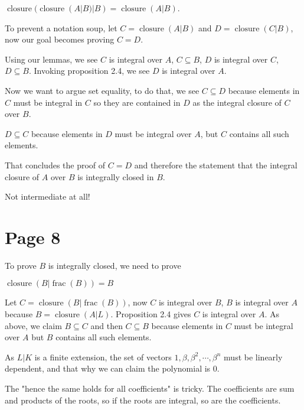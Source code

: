\documentclass{article}
\DeclareMathOperator{\fractionfield}{frac}
\DeclareMathOperator{\closure}{closure}
\begin{document}
$ \closure(\closure(A | B) | B) = \closure(A | B) $.

To prevent a notation soup, let $ C = \closure(A | B) $ and $ D = \closure(C | B) $, now our goal becomes proving $ C = D $.

Using our lemmas, we see $ C $ is integral over $ A $, $ C \subseteq B $, $ D $ is integral over $ C $, $ D \subseteq B $. Invoking proposition 2.4, we see $ D $ is integral over $ A $.

Now we want to argue set equality, to do that, we see 
$ C \subseteq D $ because elements in $ C $ must be integral in $ C $ so they are contained in $ D $ as the integral closure of $ C $ over $ B $.

$ D \subseteq C $ because elements in $ D $ must be integral over $ A $, but $ C $ contains all such elements.

That concludes the proof of $ C = D $ and therefore the statement that the integral closure of $ A $ over $ B $ is integrally closed in $ B $.

Not intermediate at all!

\section*{Page 8}
To prove $ B $ is integrally closed, we need to prove

$ \closure(B|\fractionfield(B)) = B $

Let $ C = \closure(B|\fractionfield(B)) $, now $ C $ is integral over $ B $, $ B $ is integral over $ A $ because $ B = \closure(A|L) $. Proposition 2.4 gives $ C $ is integral over $ A $. As above, we claim $ B \subseteq C $ and then $ C \subseteq B $ because elements in $ C$ must be integral over $ A $ but $ B $ contains all such elements.

As $ L | K $ is a finite extension, the set of vectors $ 1, \beta, \beta^2, \cdots, \beta^n $ must be linearly dependent, and that why we can claim the polynomial is 0.

The "hence the same holds for all coefficients" is tricky. The coefficients are sum and products of the roots, so if the roots are integral, so are the coefficients.
\end{document}
